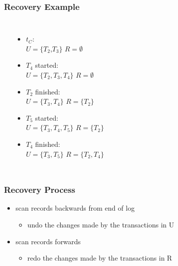 \documentclass[dvipsnames]{beamer}
\theoremstyle{plain}
\begin{document}
\begin{frame}
  \frametitle{Recovery Example}

  \begin{example}
    \begin{columns}[t]
      \begin{center}
      \end{center}

      \pause
      \begin{itemize}
        \item $t_C$:\\
          $U=\{T_2$,$T_3\}$
          $R=\emptyset$

        \pause
        \item $T_4$ started:\\
          $U=\{T_2,T_3,T_4\}$
          $R=\emptyset$

        \pause
        \item $T_2$ finished:\\
          $U=\{T_3,T_4\}$
          $R=\{T_2\}$

        \pause
        \item $T_5$ started:\\
          $U=\{T_3,T_4,T_5\}$
          $R=\{T_2\}$

        \pause
        \item $T_4$ finished:\\
          $U=\{T_3,T_5\}$
          $R=\{T_2,T_4\}$
      \end{itemize}
    \end{columns}
  \end{example}
\end{frame}

\begin{frame}
  \frametitle{Recovery Process}

  \begin{itemize}
    \item scan records backwards from end of log
    \begin{itemize}
      \item undo the changes made by the transactions in U
    \end{itemize}

    \pause
    \item scan records forwards
    \begin{itemize}
      \item redo the changes made by the transactions in R
    \end{itemize}
  \end{itemize}
\end{frame}
\end{document}
